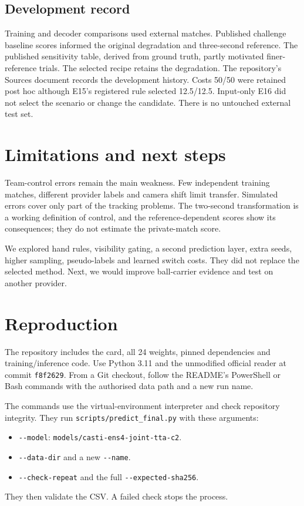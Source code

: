 \documentclass[conference,a4paper]{IEEEtran}
\begin{document}
\newpage
\subsection{Development record}
Training and decoder comparisons used external matches. Published challenge
baseline scores informed the original degradation and three-second reference.
The published sensitivity table, derived from ground truth, partly motivated
finer-reference trials. The selected recipe retains the degradation.
The repository's Sources document records the development history.
Costs 50/50 were retained post hoc although E15's registered rule selected
12.5/12.5. Input-only E16 did not select the scenario or change the candidate.
There is no untouched external test set.

\section{Limitations and next steps}
Team-control errors remain the main weakness. Few independent training matches,
different provider labels and camera shift limit transfer. Simulated errors
cover only part of the tracking problems. The two-second transformation is a
working definition of control, and the reference-dependent scores show its
consequences; they do not estimate the private-match score.

We explored hand rules, visibility gating, a second prediction layer, extra
seeds, higher sampling, pseudo-labels and learned switch costs. They did not
replace the selected method. Next, we would improve ball-carrier evidence and
test on another provider.

\section{Reproduction}
The repository includes the card, all 24 weights, pinned dependencies and
training/inference code. Use Python 3.11 and the unmodified official reader at
commit \texttt{f8f2629}. From a Git checkout, follow the README's PowerShell or
Bash commands with the authorised data path and a new run name.

{\raggedright
The commands use the virtual-environment interpreter and check repository integrity.
They run \texttt{scripts/predict\_final.py} with these arguments:
\begin{itemize}
\item \texttt{-{}-model}: \texttt{models/casti-ens4-joint-tta-c2}.
\item \texttt{-{}-data-dir} and a new \texttt{-{}-name}.
\item \texttt{-{}-check-repeat} and the full \texttt{-{}-expected-sha256}.
\end{itemize}
They then validate the CSV. A failed check stops the process.\par}
\end{document}
